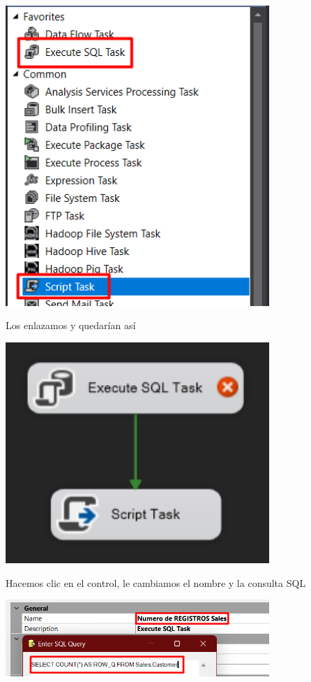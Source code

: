 \documentclass[12pt,letterpaper]{article}
\begin{document}
\begin{center}
    \includegraphics[width=10cm]{./img/img20.png}
\end{center}

Los enlazamos y quedarían así

\begin{center}
    \includegraphics[width=10cm]{./img/img21.png}
\end{center}

Hacemos clic en el control, le cambiamos el nombre y la consulta SQL

\begin{center}
    \includegraphics[width=10cm]{./img/img22.png}
\end{center}
\end{document}
